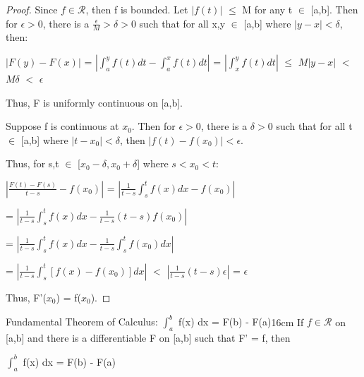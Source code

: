     \begin{proof}
        Since $f \in \mathscr{R}$, then f is bounded.
        Let $|f(t)|$ $\leq$ M for any t $\in$ [a,b].
        Then for $\epsilon > 0$, there is a $\frac{\epsilon}{M} > \delta > 0$
        such that for all x,y $\in$ [a,b] where $|y-x| < \delta$, then:

        \hspace{0.5cm}
        $|F(y) - F(x)|$
        = $|\int_a^y f(t) dt - \int_a^x f(t) dt|$
        = $|\int_x^y f(t) dt|$
        $\leq$ $M|y-x|$
        $<$ $M\delta$
        $<$ $\epsilon$

        Thus, F is uniformly continuous on [a,b].

        Suppose f is continuous at $x_0$.
        Then for $\epsilon > 0$, there is a $\delta > 0$ such that
        for all t $\in$ [a,b] where $|t - x_0| < \delta$, then
        $|f(t) - f(x_0)| < \epsilon$.

        Thus, for s,t $\in$ [$x_0-\delta,x_0+\delta$] where $s < x_0 < t$:

        \hspace{0.5cm}
        $|\frac{F(t) - F(s)}{t-s} - f(x_0)|$
        = $|\frac{1}{t-s} \int_s^t f(x) dx - f(x_0)|$

        \hspace{3.8cm}
        = $|\frac{1}{t-s} \int_s^t f(x) dx - \frac{1}{t-s} (t-s) f(x_0)|$

        \hspace{3.8cm}
        = $|\frac{1}{t-s} \int_s^t f(x) dx - \frac{1}{t-s} \int_s^t f(x_0) dx|$

        \hspace{3.8cm}
        = $|\frac{1}{t-s} \int_s^t [f(x) - f(x_0)] dx|$
        $<$ $|\frac{1}{t-s} (t-s)\epsilon|$
        = $\epsilon$

        Thus, F'($x_0$) = f($x_0$).
    \end{proof}

    \newpage



    \begin{wtheorem}{Fundamental Theorem of Calculus:
    $\int_a^b$ f(x) dx = F(b) - F(a)}{16cm}
        If $f \in \mathscr{R}$ on [a,b] and there is a differentiable F
        on [a,b] such that F' = f, then

        \hspace{0.5cm}
        $\int_a^b$ f(x) dx = F(b) - F(a)        
    \end{wtheorem}

